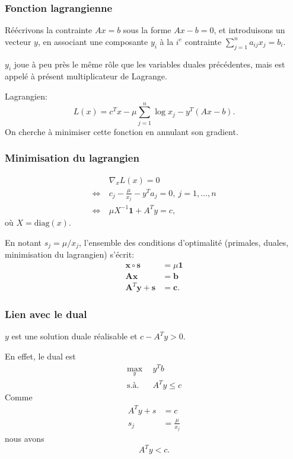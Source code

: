 \documentclass[usepdftitle=false, aspectratio=169]{beamer}
\def\bb{\boldsymbol{b}}
\def\bc{\boldsymbol{c}}
\def\bs{\boldsymbol{s}}
\def\bx{\boldsymbol{x}}
\def\by{\boldsymbol{y}}
\def\bA{\boldsymbol{A}}
\def\bone{\boldsymbol{1}}
\begin{document}
\begin{frame}
\frametitle{Fonction lagrangienne}

Réécrivons la contrainte $Ax = b$ sous la forme $Ax - b = 0$, et introduisons un vecteur $y$, en associant une composante $y_i$ à la $i^e$ contrainte $\sum_{j = 1}^n a_{ij} x_j = b_i$.

\mbox{}

$y_i$ joue à peu près le même rôle que les variables duales précédentes, mais est appelé à présent multiplicateur de Lagrange.

\mbox

Lagrangien:
\[
L(x) = c^Tx - \mu \sum_{j = 1}^n \log x_j - y^T(Ax - b).
\]
On cherche à minimiser cette fonction en annulant son gradient.

\end{frame}

\begin{frame}
\frametitle{Minimisation du lagrangien}

\begin{align*}
& \nabla_x L(x) = 0 \\
\Leftrightarrow\ &
c_j - \frac{\mu}{x_j} - y^Ta_j = 0,\ j = 1,\ldots,n\\
\Leftrightarrow\ &
\mu X^{-1}\bone + A^Ty = c,
\end{align*}
où $X = \text{diag}(x)$.

\mbox{}

En notant $s_j = \mu/x_j$, l'ensemble des conditions d'optimalité (primales, duales, minimisation du lagrangien) s'écrit:
\begin{align*}
\bx \circ \bs &= \mu \bone \\
\bA\bx &= \bb \\
\bA^T\by + \bs & = \bc.
\end{align*}

\end{frame}

\begin{frame}
\frametitle{Lien avec le dual}

$y$ est une solution duale réalisable et $c - A^T y > 0$.

\mbox{}

En effet, le dual est
\begin{align*}
\max_y\ \ & y^T b \\
\mbox{s.à. } & A^T y \leq c
\end{align*}
Comme
\begin{align*}
A^Ty + s &= c\\
s_j &= \frac{\mu}{x_j}
\end{align*}
nous avons
\[
A^T y < c.
\]

\end{frame}
\end{document}
